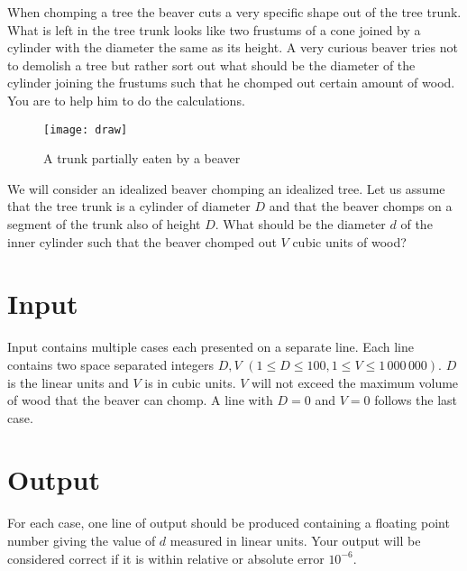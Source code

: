 
When chomping a tree the beaver cuts a very specific shape out of the tree trunk.  What is left in
the tree trunk looks like two frustums of a cone joined by a cylinder with the diameter the same as
its height.  A very curious beaver tries not to demolish a tree but rather sort out what should be
the diameter of the cylinder joining the frustums such that he chomped out certain amount of wood.
You are to help him to do the calculations.

\begin{figure}[h]
  \begin{center}
    \texttt{[image: draw]}
  \end{center}
  \caption{A trunk partially eaten by a beaver}
  \label{fig:example}
\end{figure}

We will consider an idealized beaver chomping an idealized tree.  Let us assume that the tree trunk
is a cylinder of diameter $D$ and that the beaver chomps on a segment of the trunk also of height
$D$.  What should be the diameter $d$ of the inner cylinder such that the beaver chomped out $V$
cubic units of wood?

\section*{Input}
Input contains multiple cases each presented on a separate line.  Each line contains two space
separated integers $D, V$ $(1\leq D\leq 100, 1\leq V\leq 1\,000\,000)$. $D$ is the linear units and
$V$ is in cubic units. $V$ will not exceed the maximum volume of wood that the beaver can chomp.  A
line with $D=0$ and $V=0$ follows the last case.

\section*{Output}
For each case, one line of output should be produced containing a floating point number giving the
value of $d$ measured in linear units. Your output will be considered correct if it is within
relative or absolute error $10^{-6}$.
